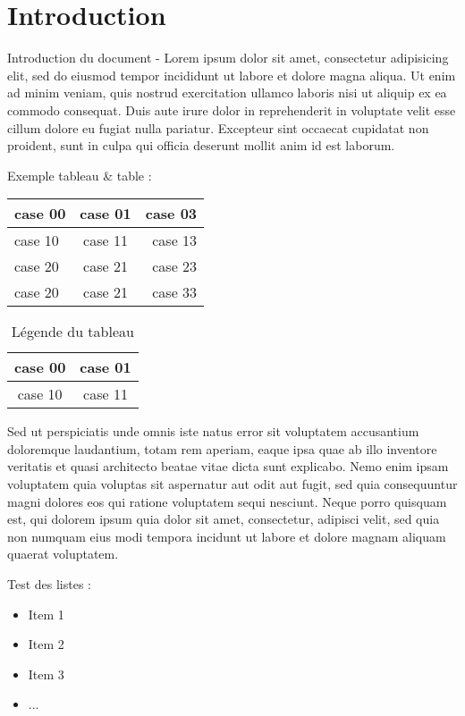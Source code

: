 	\chapter{Introduction}

Introduction du document - 	Lorem ipsum dolor sit amet, consectetur adipisicing elit, sed do eiusmod tempor incididunt ut labore et dolore magna aliqua. Ut enim ad minim veniam, quis nostrud exercitation ullamco laboris nisi ut aliquip ex ea commodo consequat. Duis aute irure dolor in reprehenderit in voluptate velit esse cillum dolore eu fugiat nulla pariatur. Excepteur sint occaecat cupidatat non proident, sunt in culpa qui officia deserunt mollit anim id est laborum.

Exemple tableau \& table : 

\begin{tabular}{|l|c|r|}
	\hline \textbf{case 00} & \textbf{case 01} & \textbf{case 03} \\
	\hline case 10 & case 11 & case 13 \\ 
	case 20 & case 21 & case 23 \\ 
	case 20 & case 21 & case 33 \\ 
	\hline
\end{tabular}

\begin{table}
\begin{center}
	\begin{tabular}{|c|c|}
		\hline case 00 & case 01 \\
		\hline case 10 & case 11 \\ 
		\hline 
	\end{tabular}
	\caption{Légende du tableau}
\end{center}
\end{table}


Sed ut perspiciatis unde omnis iste natus error sit voluptatem accusantium doloremque laudantium, totam rem aperiam, eaque ipsa quae ab illo inventore veritatis et quasi architecto beatae vitae dicta sunt explicabo. Nemo enim ipsam voluptatem quia voluptas sit aspernatur aut odit aut fugit, sed quia consequuntur magni dolores eos qui ratione voluptatem sequi nesciunt. Neque porro quisquam est, qui dolorem ipsum quia dolor sit amet, consectetur, adipisci velit, sed quia non numquam eius modi tempora incidunt ut labore et dolore magnam aliquam quaerat voluptatem. 

Test des listes : 

\begin{itemize}
	\item Item 1
	\item Item 2
	\item Item 3
	\item ...
\end{itemize}


